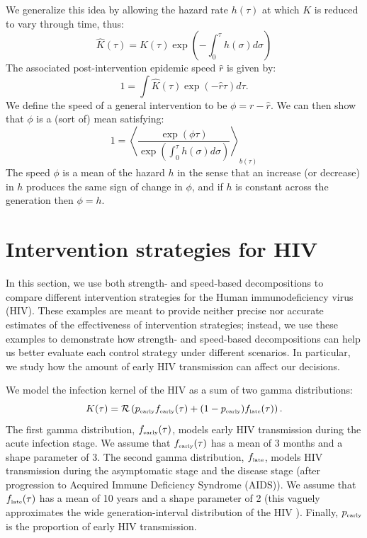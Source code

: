 \documentclass{article}\usepackage[]{graphicx}\usepackage[]{color}
\newcommand{\tsub}[2]{#1_{{\textrm{\tiny #2}}}}
\begin{document}
We generalize this idea by allowing the hazard rate $h(\tau)$ at which $K$ is reduced to vary through time, thus:
\begin{equation}
	\hat K(\tau) = K(\tau) \exp\left(-\int_0^\tau h(\sigma) d\sigma\right)
\end{equation}
The associated post-intervention epidemic speed $\hat r$ is given by:
\begin{equation}
	1 = \int \hat K(\tau) \exp(-\hat r\tau) d\tau.	
\end{equation}
We define the speed of a general intervention to be $\phi = r - \hat r$. 
We can then show that $\phi$ is a (sort of) mean satisfying:
\begin{equation}
	1 = \left\langle \frac{\exp(\phi \tau) }{\exp\left(\int_0^\tau h(\sigma) d\sigma\right)} \right\rangle_{b(\tau)}
\end{equation}
The speed $\phi$ is a mean of the hazard $h$ in the sense that an increase (or decrease) in $h$ produces the same sign of change in $\phi$, and if $h$ is constant across the generation then $\phi=h$.

\section{Intervention strategies for HIV}

In this section, we use both strength- and speed-based decompositions to compare different intervention strategies for the Human immunodeficiency virus (HIV). 
These examples are meant to provide neither precise nor accurate estimates of the effectiveness of intervention strategies; 
instead, we use these examples to demonstrate how strength- and speed-based decompositions can help us better evaluate each control strategy under different scenarios.
In particular, we study how the amount of early HIV transmission can affect our decisions.

We model the infection kernel of the HIV as a sum of two gamma distributions:
\begin{equation}
K(\tau) = \mathcal R \left(\tsub{p}{early} \tsub{f}{early}(\tau) + (1-\tsub{p}{early}) \tsub{f}{late}(\tau) \right).
\end{equation}
The first gamma distribution, $\tsub{f}{early}(\tau)$, models early HIV transmission during the acute infection stage.
We assume that $\tsub{f}{early}(\tau)$ has a mean of 3 months \citep{hollingsworth2008hiv} and a shape parameter of 3.
The second gamma distribution, $\tsub{f}{late}$, models HIV transmission during the asymptomatic stage and the disease stage (after progression to Acquired Immune Deficiency Syndrome (AIDS)).
We assume that $\tsub{f}{late}(\tau)$ has a mean of 10 years \citep{babiker2000time} and a shape parameter of 2 (this vaguely approximates the wide generation-interval distribution of the HIV \citep{fraser2004factors}).
Finally, $\tsub{p}{early}$ is the proportion of early HIV transmission.
\end{document}
